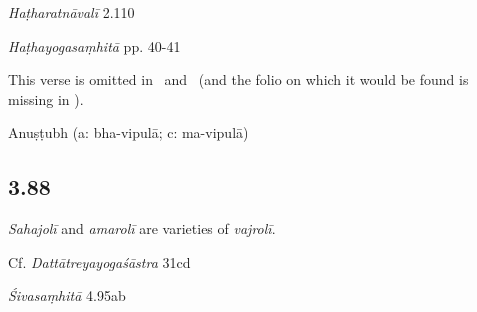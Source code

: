 \begin{ekdosis}
\begin{testimonia}[hp03_087_1]
\emph{Haṭharatnāvalī} 2.110
\begin{versinnote}
\end{versinnote}

\emph{Haṭhayogasaṃhitā} pp. 40-41
\begin{versinnote}
\end{versinnote}

\end{testimonia}

\begin{philcomm}[hp03_087_1]
This verse is omitted in \alphaTwo\ and \alphaThree\ (and the folio on which it would be found is missing in \alphaOne).
\end{philcomm}

\begin{metre}[hp03_087_1]
Anuṣṭubh (a: bha-vipulā; c: ma-vipulā)
\end{metre}

\subsection*{3.88}
\begin{translation}[hp03_088]
\emph{Sahajolī} and \emph{amarolī} are varieties of \emph{vajrolī}. 
\end{translation}

\begin{sources}[hp03_088]
Cf. \emph{Dattātreyayogaśāstra} 31cd
\begin{versinnote}
\end{versinnote}

\emph{Śivasaṃhitā} 4.95ab
\begin{versinnote}
\end{versinnote}
\end{sources}


\end{ekdosis}
